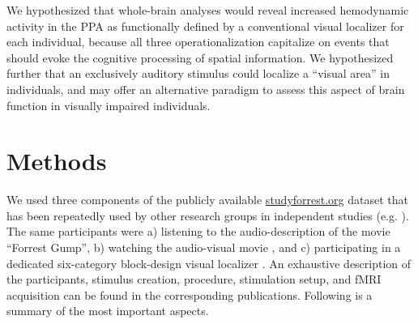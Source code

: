 \documentclass[english]{article}
\begin{document}
We hypothesized that whole-brain analyses would reveal increased hemodynamic
activity in the PPA as functionally defined by a
conventional visual localizer for each individual, because all three operationalization capitalize
on events that should evoke the cognitive processing of spatial information.
We hypothesized further that an exclusively auditory stimulus could localize a
``visual area'' in individuals,
and may offer an alternative paradigm to assess this aspect of brain function
in visually impaired individuals.



\section{Methods}


We used three components of the publicly available
\href{http://www.studyforrest.org}{studyforrest.org} dataset that has
been repeatedly used by other research groups in independent studies (e.g.
\citep{ben2018hippocampal, jiahui2019predicting, hu2017decoding,
lettieri2019emotionotopy, nguyen2016integration}).
The same participants were
a) listening to the audio-description \citep{hanke2014audiomovie} of
the movie ``Forrest Gump'',
b) watching the audio-visual movie \citep{hanke2016simultaneous}, and
c) participating in a dedicated six-category block-design visual localizer \citep{sengupta2016extension}.
An exhaustive description of the participants, stimulus creation, procedure,
stimulation setup, and fMRI acquisition can be found in the corresponding
publications. Following is a summary of the most important aspects.
\end{document}
